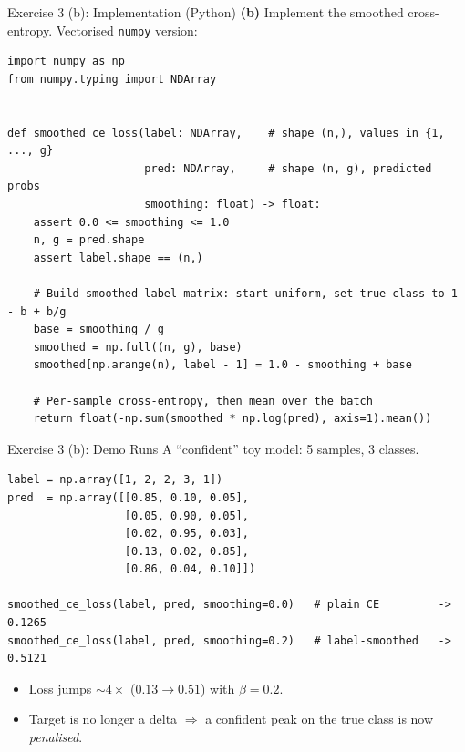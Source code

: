 \documentclass[aspectratio=169]{beamer}
\begin{document}
\begin{frame}[fragile]{Exercise 3 (b): Implementation (Python)}
	\small
	\textbf{(b)} Implement the smoothed cross-entropy. Vectorised \texttt{numpy} version:

	\vspace{4pt}
	\begin{lstlisting}[style=Pystyle]
import numpy as np
from numpy.typing import NDArray


def smoothed_ce_loss(label: NDArray,    # shape (n,), values in {1, ..., g}
                     pred: NDArray,     # shape (n, g), predicted probs
                     smoothing: float) -> float:
    assert 0.0 <= smoothing <= 1.0
    n, g = pred.shape
    assert label.shape == (n,)

    # Build smoothed label matrix: start uniform, set true class to 1 - b + b/g
    base = smoothing / g
    smoothed = np.full((n, g), base)
    smoothed[np.arange(n), label - 1] = 1.0 - smoothing + base

    # Per-sample cross-entropy, then mean over the batch
    return float(-np.sum(smoothed * np.log(pred), axis=1).mean())
	\end{lstlisting}
\end{frame}

\begin{frame}[fragile]{Exercise 3 (b): Demo Runs}
	\small
	A ``confident'' toy model: 5 samples, 3 classes.

	\vspace{2pt}
	\begin{lstlisting}[style=Pystyle, basicstyle=\ttfamily\fontsize{7pt}{8pt}\selectfont]
label = np.array([1, 2, 2, 3, 1])
pred  = np.array([[0.85, 0.10, 0.05],
                  [0.05, 0.90, 0.05],
                  [0.02, 0.95, 0.03],
                  [0.13, 0.02, 0.85],
                  [0.86, 0.04, 0.10]])

smoothed_ce_loss(label, pred, smoothing=0.0)   # plain CE         -> 0.1265
smoothed_ce_loss(label, pred, smoothing=0.2)   # label-smoothed   -> 0.5121
	\end{lstlisting}

	\vspace{4pt}
	\begin{tcolorbox}[
		title=Takeaway,
		colback=white,
		colframe=violet,
		fonttitle=\bfseries,
		boxrule=0.8pt,
		arc=2pt,
		left=4pt, right=4pt, top=2pt, bottom=2pt
	]
	\footnotesize
	\begin{itemize}\setlength\itemsep{2pt}\setlength\topsep{0pt}
		\item Loss jumps $\sim\!4\times$ ($0.13 \to 0.51$) with $\beta = 0.2$.
		\item Target is no longer a delta $\Rightarrow$ a confident peak on the true class is now \emph{penalised}.
	\end{itemize}
	\end{tcolorbox}
\end{frame}
\end{document}
